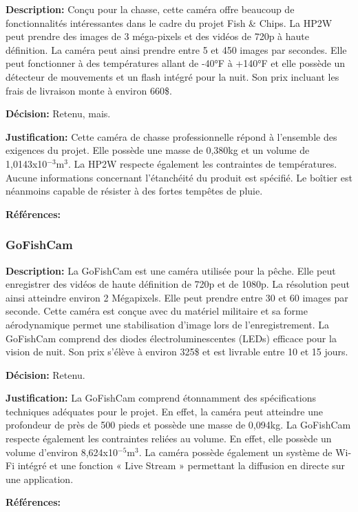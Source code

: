 \textbf{Description:} Conçu pour la chasse, cette caméra offre beaucoup de fonctionnalités intéressantes dans le cadre du projet Fish \& Chips. La HP2W peut prendre des images de 3 méga-pixels et des vidéos de 720p à haute définition. La caméra peut ainsi prendre entre 5 et 450 images par secondes. Elle peut fonctionner à des températures allant de -40°F à +140°F et elle possède un détecteur de mouvements et un flash intégré pour la nuit. Son prix incluant les frais de livraison monte à environ 660\$.

\textbf{Décision:} Retenu, mais.

\textbf{Justification:} Cette caméra de chasse professionnelle répond à l'ensemble des exigences du projet. Elle possède une masse de 0,380kg et un volume de 1,0143x10$^{-3}$m$^3$. La HP2W respecte également les contraintes de températures. Aucune informations concernant l'étanchéité du produit est spécifié. Le boîtier est néanmoins capable de résister à des fortes tempêtes de pluie.

\textbf{Références:} \cite{HP2W}


\subsubsection{GoFishCam}

\textbf{Description:} La GoFishCam est une caméra utilisée pour la pêche. Elle peut enregistrer des vidéos de haute définition de 720p et de 1080p. La résolution peut ainsi atteindre environ 2 Mégapixels. Elle peut prendre entre 30 et 60 images par seconde. Cette caméra est conçue avec du matériel militaire et sa forme aérodynamique permet une stabilisation d'image lors de l'enregistrement. La GoFishCam comprend des diodes électroluminescentes (LEDs) efficace pour la vision de nuit. Son prix s'élève à environ 325\$ et est livrable entre 10 et 15 jours.

\textbf{Décision:} Retenu.

\textbf{Justification:} La GoFishCam comprend étonnamment des spécifications techniques adéquates pour le projet. En effet, la caméra peut atteindre une profondeur de près de 500 pieds et possède une masse de 0,094kg. La GoFishCam respecte également les contraintes reliées au volume. En effet, elle possède un volume d'environ 8,624x10$^{-5}$m$^3$. La caméra possède également un système de Wi-Fi intégré et une fonction « Live Stream » permettant la diffusion en directe sur une application.

\textbf{Références:} \cite{GoFishCam} \cite{GoFishCam_resolution}


